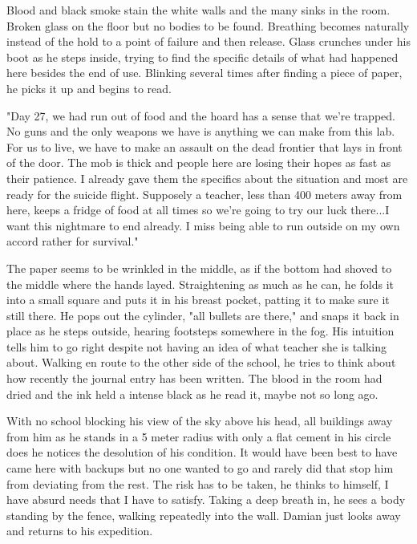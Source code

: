 \begin{Document}
        Blood and black smoke stain the white walls and the many sinks in the room. Broken glass on the floor but no bodies to be found. Breathing becomes 
    naturally instead of the hold to a point of failure and then release. Glass crunches under his boot as he steps inside, trying to find the specific details
    of what had happened here besides the end of use. Blinking several times after finding a piece of paper, he picks it up and begins to read.

        "Day 27, we had run out of food and the hoard has a sense that we're trapped. No guns and the only weapons we have is anything we can make from this lab.
    For us to live, we have to make an assault on the dead frontier that lays in front of the door. The mob is thick and people here are losing their hopes as
    fast as their patience. I already gave them the specifics about the situation and most are ready for the suicide flight. Supposely a teacher, less than 
    400 meters away from here, keeps a fridge of food at all times so we're going to try our luck there...I want this nightmare to end already. I miss being
    able to run outside on my own accord rather for survival."

        The paper seems to be wrinkled in the middle, as if the bottom had shoved to the middle where the hands layed.  Straightening as much as he can, he folds
    it into a small square and puts it in his breast pocket, patting it to make sure it still there. He pops out the cylinder, "all bullets are there," and snaps
    it back in place as he steps outside, hearing footsteps somewhere in the fog. His intuition tells him to go right despite not having an idea of what teacher
    she is talking about. Walking en route to the other side of the school, he tries to think about how recently the journal entry has been written. The blood in
    the room had dried and the ink held a intense black as he read it, maybe not so long ago.

        With no school blocking his view of the sky above his head, all buildings away from him as he stands in a 5 meter radius with only a flat cement in his
    circle does he notices the desolution of his condition. It would have been best to have came here with backups but no one wanted to go and rarely did that
    stop him from deviating from the rest. The risk has to be taken, he thinks to himself, I have absurd needs that I have to satisfy. Taking a deep breath in,
    he sees a body standing by the fence, walking repeatedly into the wall. Damian just looks away and returns to his expedition.


\end{Document}
